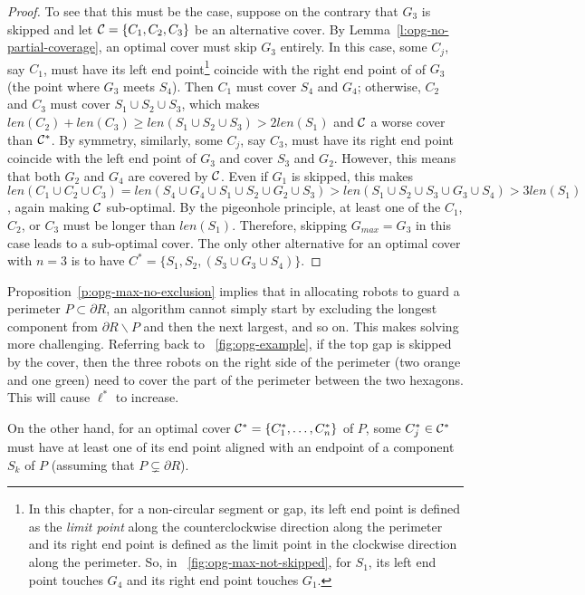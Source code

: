 \begin{proof}
To see that this must be the case, suppose on the contrary that $G_3$ 
is skipped and let $\mathcal C = \{C_1, C_2, C_3\}$ be an alternative cover. 
By Lemma~\ref{l:opg-no-partial-coverage}, an optimal cover must skip $G_3$ 
entirely. In this case, some $C_j$, say $C_1$, must have its left end 
point\footnote{In this chapter, for a non-circular segment or gap, its 
left end point is defined as the {\em limit point} along the 
counterclockwise direction along the perimeter and its right end point 
is defined as the limit point in the clockwise direction along the 
perimeter. So, in ~\ref{fig:opg-max-not-skipped}, for $S_1$, its left 
end point touches $G_4$ and its right end point touches $G_1$.} coincide 
with the right end point of of $G_3$ (the point where $G_3$ meets $S_4$). 
Then $C_1$ must cover $S_4$ and $G_4$; otherwise, $C_2$ and $C_3$ must 
cover $S_1 \cup S_2 \cup S_3$, which makes $len(C_2) + len(C_3) \ge 
len(S_1 \cup S_2 \cup S_3) > 2len(S_1)$ and $\mathcal C$ a worse cover than 
$\mathcal C^*$. By symmetry, similarly, some $C_j$, say $C_3$, must have its 
right end point coincide with the left end point of $G_3$ and cover 
$S_3$ and $G_2$. However, this means that both $G_2$ and $G_4$ are 
covered by $\mathcal C$. Even if $G_1$ is skipped, this makes $len(C_1 \cup 
C_2 \cup C_3) = len(S_4 \cup G_4 \cup S_1 \cup S_2 \cup G_2 \cup S_3) 
> len (S_1 \cup S_2 \cup S_3\cup G_3\cup S_4) > 3len(S_1)$, again making
$\mathcal C$ sub-optimal. By the pigeonhole principle, at least one of the $C_1$, 
$C_2$, or $C_3$ must be longer than $len(S_1)$. Therefore, skipping 
$G_{max} = G_3$ in this case leads to a sub-optimal cover. The only 
other alternative for an optimal cover with $n = 3$ is to have $C^* = 
\{S_1, S_2, (S_3\cup G_3\cup S_4)\}$. 
\end{proof}

Proposition~\ref{p:opg-max-no-exclusion} implies that in allocating robots 
to guard a perimeter $P \subset \partial R$, an algorithm cannot simply 
start by excluding the longest component from $\partial R 
\backslash P$ and then the next largest, and so on. This makes solving
\opg more challenging. Referring back to ~\ref{fig:opg-example}, if the 
top gap is skipped by the cover, then the three robots on the right side 
of the perimeter (two orange and one green) need to cover the part of the 
perimeter between the two hexagons. This will cause $\ell^*$ to increase. 

On the other hand, for an optimal cover $\mathcal C^* = \{C_1^*, \ldots, C_n^*\}$ 
of $P$, some $C_j^*\in \mathcal C^*$ must have at least one of its end point 
aligned with an endpoint of a component $S_k$ of $P$ (assuming that $P 
\subsetneq \partial R$). 

